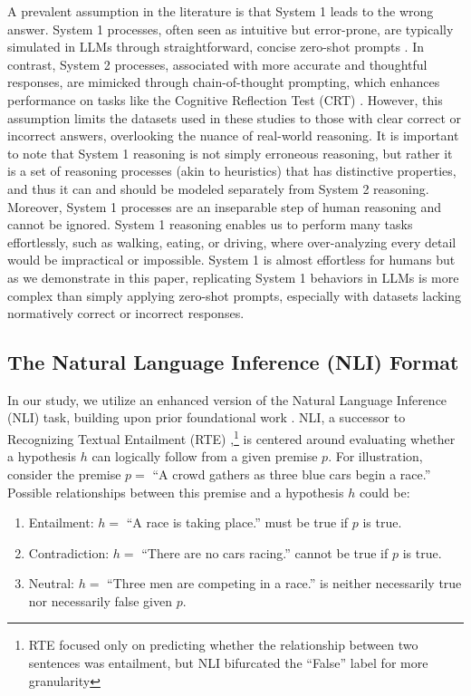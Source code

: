         A prevalent assumption in the literature is that System 1 leads to the wrong answer. System 1 processes, often seen as intuitive but error-prone, are typically simulated in LLMs through straightforward, concise zero-shot prompts \citep{kojima_large_2022, hagendorff_human-like_2023, yu_distilling_2024}. In contrast, System 2 processes, associated with more accurate and thoughtful responses, are mimicked through chain-of-thought prompting, which enhances performance on tasks like the Cognitive Reflection Test (CRT) \citep{hagendorff_human-like_2023}. However, this assumption limits the datasets used in these studies to those with clear correct or incorrect answers, overlooking the nuance of real-world reasoning. It is important to note that System 1 reasoning is not simply erroneous reasoning, but rather it is a set of reasoning processes (akin to heuristics) that has distinctive properties, and thus it can and should be modeled separately from System 2 reasoning. Moreover, System 1 processes are an inseparable step of human reasoning \citep{gilovich_heuristics_2002} and cannot be ignored. System 1 reasoning enables us to perform many tasks effortlessly, such as walking, eating, or driving, where over-analyzing every detail would be impractical or impossible. System 1 is almost effortless for humans \citep{gladwell_blink_2007} but as we demonstrate in this paper, replicating System 1 behaviors in LLMs is more complex than simply applying zero-shot prompts, especially with datasets lacking normatively correct or incorrect responses.

     \subsection{The Natural Language Inference (NLI) Format}\label{sec:nli}
        In our study, we utilize an enhanced version of the Natural Language Inference (NLI) task, building upon prior foundational work \citep{bowman_large_2015}. NLI, a successor to Recognizing Textual Entailment (RTE) \citep{quinonero-candela_pascal_2006},\footnote{RTE focused only on predicting whether the relationship between two sentences was entailment, but NLI bifurcated the ``False'' label for more granularity} is centered around evaluating whether a hypothesis $h$ can logically follow from a given premise $p$. For illustration, consider the premise $p=$ ``A crowd gathers as three blue cars begin a race.'' Possible relationships between this premise and a hypothesis $h$ could be:
        \begin{enumerate}
            \item Entailment: $h=$ ``A race is taking place.'' must be true if $p$ is true.
            \item Contradiction: $h =$ ``There are no cars racing.'' cannot be true if $p$ is true.
            \item Neutral: $h =$ ``Three men are competing in a race.'' is neither necessarily true nor necessarily false given $p$.
        \end{enumerate}

